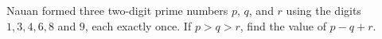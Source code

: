 Nauan formed three two-digit prime numbers $p$, $q$, and $r$ using the digits $1, 3, 4, 6, 8$ and $9$, each exactly once. If $p>q>r$, find the value of $p-q+r$.
